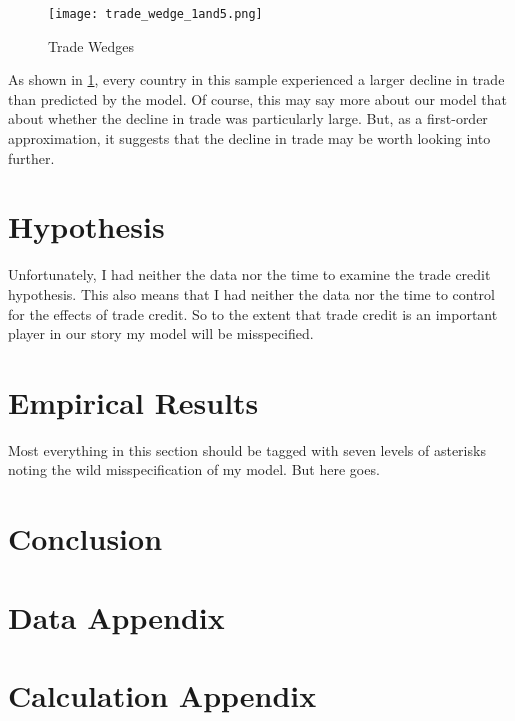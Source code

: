 \documentclass[11pt]{article}
\begin{document}
  \begin{figure} \label{fig:trade_wedge}
    \centering
      \texttt{[image: trade\_wedge\_1and5.png]}
    \caption{Trade Wedges}
  \end{figure}

  As shown in \ref{fig:trade_wedge}, every country in this sample experienced a larger decline in trade than predicted by the model.  Of course, this may say more about our model that about whether the decline in trade was particularly large.  But, as a first-order approximation, it suggests that the decline in trade may be worth looking into further.

\section{Hypothesis}
\label{sec:hypothesis}
  Unfortunately, I had neither the data nor the time to examine the trade credit hypothesis.  This also means that I had neither the data nor the time to control for the effects of trade credit.  So to the extent that trade credit is an important player in our story my model will be misspecified.

\section{Empirical Results} %
\label{sec:empirical_results}
  Most everything in this section should be tagged with seven levels of asterisks noting the wild misspecification of my model.  But here goes.

  
\section{Conclusion}
\label{sec:conclusion}

\section{Data Appendix}
\label{sec:data_appendix}

\section{Calculation Appendix}
\label{sec:calculation_appendix}





\end{document}
